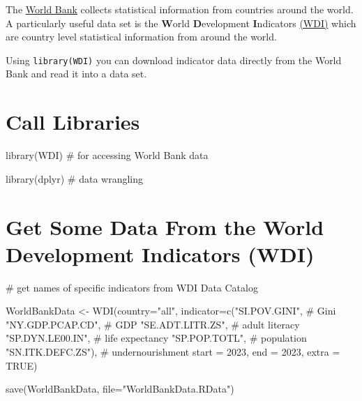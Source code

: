 \documentclass[
  letterpaper,
  DIV=11,
  numbers=noendperiod,
  oneside]{scrreprt}
\newenvironment{Shaded}{\begin{snugshade}}{\end{snugshade}}
\newcommand{\AttributeTok}[1]{\textcolor[rgb]{0.40,0.45,0.13}{#1}}
\newcommand{\CommentTok}[1]{\textcolor[rgb]{0.37,0.37,0.37}{#1}}
\newcommand{\ConstantTok}[1]{\textcolor[rgb]{0.56,0.35,0.01}{#1}}
\newcommand{\DecValTok}[1]{\textcolor[rgb]{0.68,0.00,0.00}{#1}}
\newcommand{\FunctionTok}[1]{\textcolor[rgb]{0.28,0.35,0.67}{#1}}
\newcommand{\NormalTok}[1]{\textcolor[rgb]{0.00,0.23,0.31}{#1}}
\newcommand{\OtherTok}[1]{\textcolor[rgb]{0.00,0.23,0.31}{#1}}
\newcommand{\StringTok}[1]{\textcolor[rgb]{0.13,0.47,0.30}{#1}}
\begin{document}
The \href{http://www.worldbank.org/}{World Bank} collects statistical
information from countries around the world. A particularly useful data
set is the \textbf{W}orld \textbf{D}evelopment \textbf{I}ndicators
\href{http://data.worldbank.org/data-catalog/world-development-indicators}{(WDI)}
which are country level statistical information from around the world.

Using \texttt{library(WDI)} you can download indicator data directly
from the World Bank and read it into a data set.

\section{Call Libraries}\label{call-libraries-3}

\begin{Shaded}
\begin{Highlighting}[]
\FunctionTok{library}\NormalTok{(WDI) }\CommentTok{\# for accessing World Bank data}

\FunctionTok{library}\NormalTok{(dplyr) }\CommentTok{\# data wrangling}
\end{Highlighting}
\end{Shaded}

\section{Get Some Data From the World Development Indicators
(WDI)}\label{get-some-data-from-the-world-development-indicators-wdi}

\begin{Shaded}
\begin{Highlighting}[]
\CommentTok{\# get names of specific indicators from WDI Data Catalog}

\NormalTok{WorldBankData }\OtherTok{\textless{}{-}} \FunctionTok{WDI}\NormalTok{(}\AttributeTok{country=}\StringTok{"all"}\NormalTok{, }
                     \AttributeTok{indicator=}\FunctionTok{c}\NormalTok{(}\StringTok{"SI.POV.GINI"}\NormalTok{, }\CommentTok{\# Gini}
                                 \StringTok{"NY.GDP.PCAP.CD"}\NormalTok{, }\CommentTok{\# GDP}
                                 \StringTok{"SE.ADT.LITR.ZS"}\NormalTok{, }\CommentTok{\# adult literacy}
                                 \StringTok{"SP.DYN.LE00.IN"}\NormalTok{, }\CommentTok{\# life expectancy}
                                 \StringTok{"SP.POP.TOTL"}\NormalTok{, }\CommentTok{\# population}
                                 \StringTok{"SN.ITK.DEFC.ZS"}\NormalTok{), }\CommentTok{\# undernourishment}
                     \AttributeTok{start =} \DecValTok{2023}\NormalTok{, }
                     \AttributeTok{end =} \DecValTok{2023}\NormalTok{, }
                     \AttributeTok{extra =} \ConstantTok{TRUE}\NormalTok{) }


\FunctionTok{save}\NormalTok{(WorldBankData, }\AttributeTok{file=}\StringTok{"WorldBankData.RData"}\NormalTok{)}
\end{Highlighting}
\end{Shaded}
\end{document}
